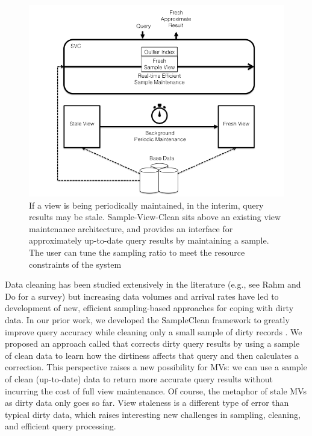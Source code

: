 \begin{figure}[t] \vspace{-2em}
\centering
 \includegraphics[scale=0.30]{figs/sys-arch.png} \vspace{-.25em}
 \caption{If a view is being periodically maintained, in the interim, query results may be stale. Sample-View-Clean sits above an existing view maintenance architecture, and provides an interface for approximately up-to-date query results by maintaining a sample. The user can tune the sampling ratio to meet the resource constraints of the system\label{sys-arch}}\vspace{-1.75em}
\end{figure}

Data cleaning has been studied extensively in the literature (e.g., see Rahm and Do for a survey\cite{rahm2000data}) but increasing data volumes and arrival rates have led to development of new, efficient sampling-based approaches for coping with dirty data.   
In our prior work, we developed the SampleClean framework to greatly improve query accuracy while cleaning only a small sample of dirty records \cite{wang1999sample}.  
We proposed an approach called \nsc that corrects dirty query results by using a sample of clean data to learn how the dirtiness affects that query and then calculates a correction.  
This perspective raises a new possibility for MVs: we can use a sample of clean (up-to-date) data to return more accurate query results without incurring the cost of full view maintenance.
Of course, the metaphor of stale MVs as dirty data only goes so far. 
View staleness is a different type of error than typical dirty data, which raises interesting new challenges in sampling, cleaning, and efficient query processing.

